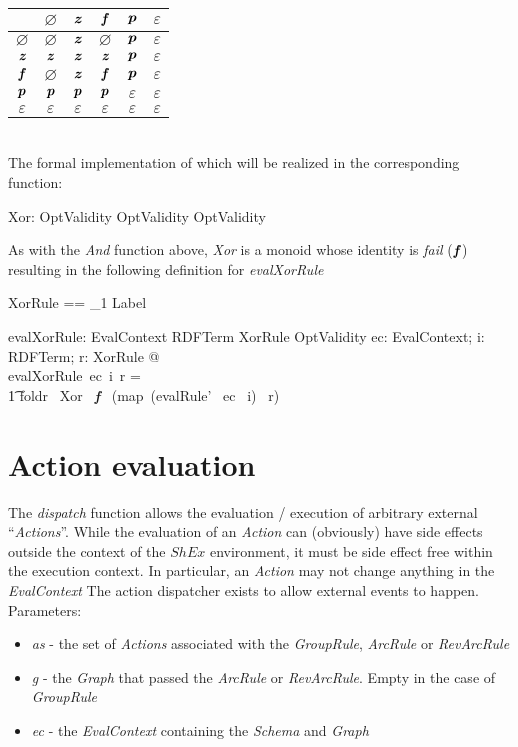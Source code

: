\documentclass[fuzz]{llncs}
\def\pass{\textbf{\textit{p}}}
\def\fail{\textbf{\textit{f}}}
\def\none{\varnothing}
\def\error{\varepsilon}
\def\nomatch{\textbf{\textit{z}}}
\def\zc{\textit}
\def\zcb{\textit{\textbf}}
\begin{document}
\begin{tabular}{c || c | c | c | c | c |}
   \hline
   \zcb{Xor} & $\none$ & $\nomatch$ & $\fail$ & $\pass$ & $\error$ \\
   \hline \hline
   $\none$ & $\none$ & $\nomatch$ & $\none$ & $\pass$ & $\error$ \\ \hline
   $\nomatch$ & $\nomatch$ & $\nomatch$ & $\nomatch$ & $\pass$ & $\error$ \\ \hline
   $\fail$ & $\none$ & $\nomatch$ & $\fail$ & $\pass$ & $\error$ \\ \hline
   $\pass$ & $\pass$ & $\pass$ & $\pass$ & $\error$ & $\error$ \\ \hline
   $\error$ & $\error$ & $\error$ & $\error$ & $\error$ & $\error$ \\ \hline 
\end{tabular}
\\
The formal implementation of which will be realized in the corresponding function:
\begin{gendef}
   Xor: OptValidity \fun OptValidity \fun OptValidity
\end{gendef}
As with the \zc{And} function above, \zc{Xor} is a monoid whose identity is \zc{fail} ($\fail$)
resulting in the following definition for \zc{evalXorRule}
\begin{zed}
XorRule == \seq_1 Label
\end{zed}
\begin{gendef}
   evalXorRule: EvalContext \fun RDFTerm \fun XorRule \fun OptValidity
\where
   \forall ec: EvalContext; i: RDFTerm; r: XorRule  @ \\
	evalXorRule~ec~i~r = \\
\t1	foldr~ Xor~ \fail ~ (map~(evalRule'~ ec ~i)~ r)
\end{gendef}



\section{Action evaluation}
The \zc{dispatch} function allows the evaluation / execution of arbitrary external ``\zc{Actions}''.  While the evaluation of an \zc{Action} can (obviously) have side effects
outside the context of the $ShEx$ environment, it must be side effect free within the 
execution context.  In particular, an \zc{Action} may not change anything in the 
\zc{EvalContext} 
The action dispatcher exists to allow external events to happen. Parameters:
\begin{itemize}
\item \zc{as} - the set of \zc{Actions} associated with the \zc{GroupRule}, \zc{ArcRule} or \zc{RevArcRule} 
\item \zc{g} - the \zc{Graph} that passed the \zc{ArcRule} or \zc{RevArcRule}.  Empty in the case of \zc{GroupRule}
\item \zc{ec} - the \zc{EvalContext} containing the \zc{Schema} and \zc{Graph}

\end{itemize}
\end{document}
